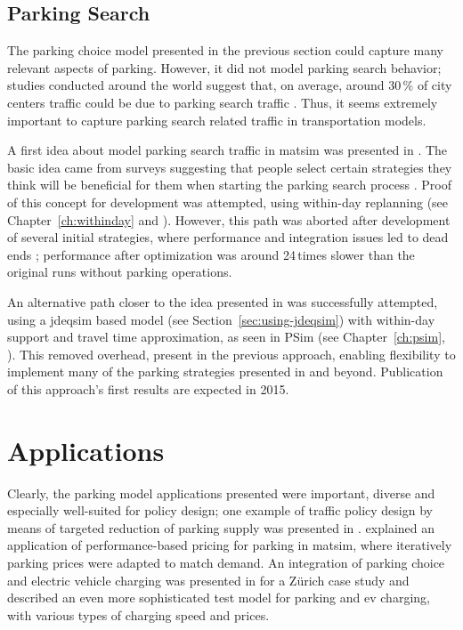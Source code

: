 \subsection{Parking Search}
The parking choice model presented in the previous section could capture many relevant aspects of parking. However, it did not model parking search behavior;  studies conducted around the world suggest that, on average, around 30\,\% of city centers traffic could be due to parking search traffic \citet[][]{Shoup_RSUE_2004}. Thus, it seems extremely important to capture parking search related traffic in transportation models.

A first idea about model parking search traffic in \gls{matsim} was presented in \citet[][]{Waraich_unpub_IATBR_2012}. The basic idea came from surveys suggesting that people select certain strategies they think will be beneficial for them when starting the parking search process \citep[][]{AxhausenPolak_1989}. Proof of this concept for development was attempted, using within-day replanning (see Chapter~\ref{ch:withinday} and \citet[][]{DoblerEtAl_TRR_2012}). However, this path was aborted after development of several initial strategies, where performance and integration issues led to dead ends \citep[][]{WaraichEtAl_unpub_TRB_2013}; performance after optimization was around 24\,times slower than the original runs without parking operations. 

An alternative path closer to the idea presented in \citet[][]{Waraich_unpub_IATBR_2012} was successfully attempted, using a \gls{jdeqsim} based model (see Section~\ref{sec:using-jdeqsim}) with within-day support and travel time approximation, as seen in PSim (see Chapter~\ref{ch:psim}, \citet[][]{FourieEtAl_TRR_2013}). This removed overhead, present in the previous approach, enabling flexibility to implement many of the parking strategies presented in \citet[][]{AxhausenPolak_1989} and beyond. Publication of this approach's first results are expected in 2015.

\section{Applications}
Clearly, the parking model applications presented were important, diverse  and especially well-suited for policy design; one example of traffic policy design by means of targeted reduction of parking supply was presented in \citet[][]{WaraichAxhausen_TRR_2012}. \citet[][]{WaraichEtAl_unpub_TRB_2013} explained an application of performance-based pricing for parking in \gls{matsim}, where iteratively parking prices were adapted to match demand. An integration of parking choice and electric vehicle charging was presented in \citet[][]{WaraichEtAl_JanssensEtAl_2014} for a Zürich case study and \citet[][]{BemetzHohenfellner_BSCThesis_2014} described an even more sophisticated test model for parking and \gls{ev} charging, with various types of charging speed and prices.

